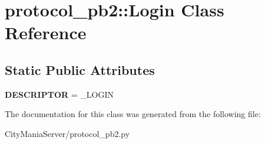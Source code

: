 \hypertarget{classprotocol__pb2_1_1Login}{
\section{protocol\_\-pb2::Login Class Reference}
\label{classprotocol__pb2_1_1Login}
}
\subsection*{Static Public Attributes}
\begin{DoxyCompactItemize}
\item 
\hypertarget{classprotocol__pb2_1_1Login_a85fcf277b3ea4cae2dd06d55f468b12d}{
{\bfseries DESCRIPTOR} = \_\-LOGIN}
\label{classprotocol__pb2_1_1Login_a85fcf277b3ea4cae2dd06d55f468b12d}

\end{DoxyCompactItemize}


The documentation for this class was generated from the following file:\begin{DoxyCompactItemize}
\item 
CityManiaServer/protocol\_\-pb2.py\end{DoxyCompactItemize}
